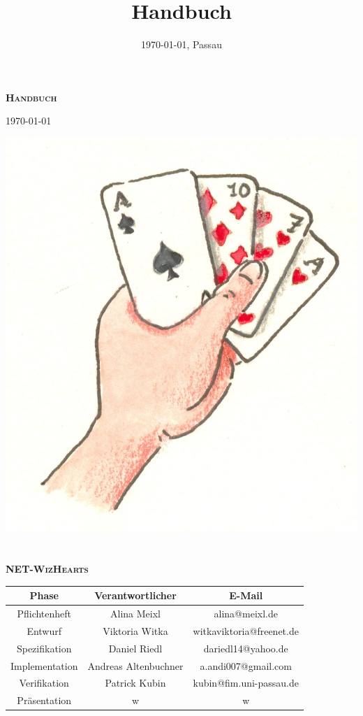 \documentclass[titlepage,10pt,a4paper]{article}
\title{Handbuch}
\date{\today{}, Passau}
\begin{document}
\begin{titlepage}
\vspace*{3cm}
\begin{center}
\textbf{\textsc{\LARGE Handbuch}}

{\large \today}

\vspace{2cm}
\includegraphics{kartenspiel}
\ \\
\ \\

\textbf{\textsc{\LARGE NET-WizHearts}}
\vspace{2cm}

\begin{tabular}{|c|c|c|}\hline
   Phase & Verantwortlicher & E-Mail \\ \hline\hline
   Pflichtenheft & Alina Meixl &  alina@meixl.de \\ \hline
   Entwurf & Viktoria Witka & witkaviktoria@freenet.de \\ \hline
   Spezifikation & Daniel Riedl & dariedl14@yahoo.de \\ \hline
   Implementation & Andreas Altenbuchner& a.andi007@gmail.com\\ \hline
   Verifikation & Patrick Kubin & kubin@fim.uni-passau.de\\ \hline
   Präsentation & w& w\\ \hline
 \end{tabular}
\vspace{2cm}
\\
\end{center}
\end{titlepage}
\tableofcontents
{}
\hypersetup{pageanchor=true}
\end{document}
